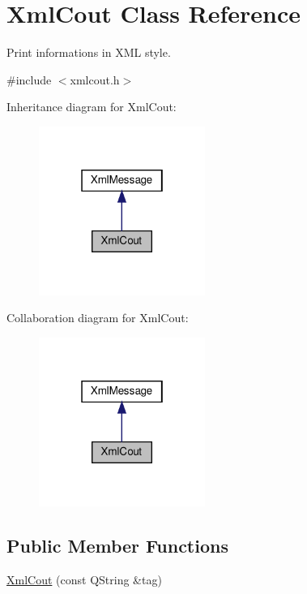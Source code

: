 \hypertarget{classXmlCout}{}\section{Xml\+Cout Class Reference}
\label{classXmlCout}


Print informations in X\+ML style.  




{\ttfamily \#include $<$xmlcout.\+h$>$}



Inheritance diagram for Xml\+Cout\+:\nopagebreak
\begin{figure}[H]
\begin{center}
\leavevmode
\includegraphics[width=154pt]{da/d53/classXmlCout__inherit__graph}
\end{center}
\end{figure}


Collaboration diagram for Xml\+Cout\+:\nopagebreak
\begin{figure}[H]
\begin{center}
\leavevmode
\includegraphics[width=154pt]{da/d67/classXmlCout__coll__graph}
\end{center}
\end{figure}
\subsection*{Public Member Functions}
\begin{DoxyCompactItemize}
\item 
\hyperlink{classXmlCout_ae895068dd12946b6b57ef1a70b9f0d7a}{Xml\+Cout} (const Q\+String \&tag)
\end{DoxyCompactItemize}
